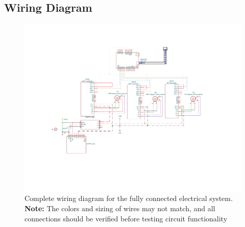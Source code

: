 \documentclass[12pt,oneside,letterpaper]{article}
\begin{document}
\begin{landscape}
\subsection{Wiring Diagram}
\begin{figure}[h!]
\centering
\includegraphics[width=\textwidth, trim=3.5cm 4.5cm 5.0cm 2.5cm, clip,scale=1.5]{Print Schematic_R7.pdf}%
\caption{Complete wiring diagram for the fully connected electrical system. \textbf{Note:} The colors and sizing of wires may not match, and all connections should be verified before testing circuit functionality}
\end{figure}
\end{landscape}
\newpage
\end{document}
